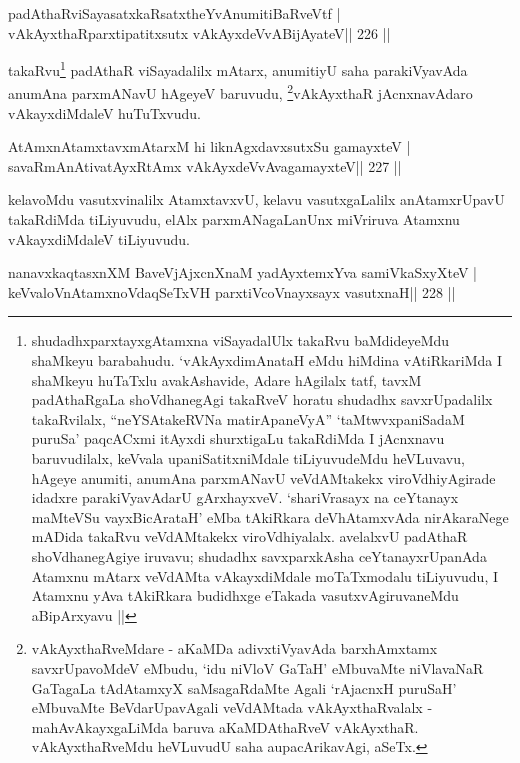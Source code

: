 \begin{shl}
padAthaRviSayasatxkaRsatxtheYvAnumitiBaRveVtf |
vAkAyxthaRparxtipatitxsutx vAkAyxdeVvABijAyateV\hfill || 226 ||
\end{shl}

\begin{artha}
takaRvu\footnote[2]{shudadhxparxtayxgAtamxna viSayadalUlx takaRvu baMdideyeMdu shaMkeyu barabahudu. `vAkAyxdimAnataH eMdu hiMdina vAtiRkariMda I shaMkeyu huTaTxlu avakAshavide, Adare hAgilalx tatf, \-tavxM padAthaRgaLa shoVdhanegAgi takaRveV horatu shudadhx savxrUpadalilx takaRvilalx, ``neYSAtakeRVNa matirApa\-neVyA'' `taMtwvxpaniSadaM puruSa' paqcACxmi itAyxdi shurxtigaLu takaRdiMda I jAcnxnavu baruvudilalx, keVvala upaniSatitxniMdale tiLiyuvudeMdu heVLuvavu, hAgeye anumiti, anumAna parxmANavU veVdAMtakekx viroVdhiyAgirade idadxre parakiVyavAdarU gArxhayxveV. `shariVrasayx na ceYtanayx maMteVSu vayxBicArataH' eMba tAkiRkara deVhAtamxvAda nirAkaraNege mADida takaRvu veVdAMtakekx viroVdhiyalalx. avelalxvU padAthaR shoVdhanegAgiye iruvavu; shudadhx savxparxkAsha ceYtanayxrUpanAda Atamxnu mAtarx veVdAMta vAkayxdiMdale moTaTxmodalu tiLiyuvudu, I Atamxnu yAva tAkiRkara budidhxge eTakada vasutxvAgiruvaneMdu aBipArxyavu ||} padAthaR viSayadalilx mAtarx, anumitiyU saha parakiVyavAda anumAna parxmANavU hAgeyeV baruvudu, \footnote[3]{vAkAyxthaRveMdare - aKaMDa adivxtiVyavAda barxhAmxtamx savxrUpavoMdeV eMbudu, `idu niVloV GaTaH' eMbuvaMte niVlavaNaR GaTagaLa tAdAtamxyX saMsagaRdaMte Agali `rAjacnxH puruSaH' eMbuvaMte BeVdarUpavAgali veVdAMtada vAkAyxthaRvalalx - mahAvAkayxgaLiMda baruva aKaMDAthaRveV vAkAyxthaR. vAkAyxthaRveMdu heVLuvudU saha aupacArikavAgi, aSeTx.}vAkAyxthaR jAcnxnavAdaro vAkayxdiMdaleV huTuTxvudu.
\end{artha}


\begin{shl}
AtAmxnAtamxtavxmAtarxM hi liknAgxdavxsutxSu gamayxteV |
savaRmAnAtivatAyxRtAmx vAkAyxdeVvAvagamayxteV\hfill || 227 ||
\end{shl}

\begin{artha}
kelavoMdu vasutxvinalilx AtamxtavxvU, kelavu vasutxgaLalilx anAtamxrUpavU takaRdiMda tiLiyuvudu, elAlx parxmANagaLanUnx miVriruva Atamxnu vAkayxdiMdaleV tiLiyuvudu.
\end{artha}


\begin{shl}
nanavxkaqtasxnXM BaveVjAjxcnXnaM yadAyxtemxYva samiVkaSxyXteV |
keVvaloV\s nAtamxnoV\s daqSeTxVH parxtiVcoV\s nayxsayx vasutxnaH\hfill || 228 ||
\end{shl}

